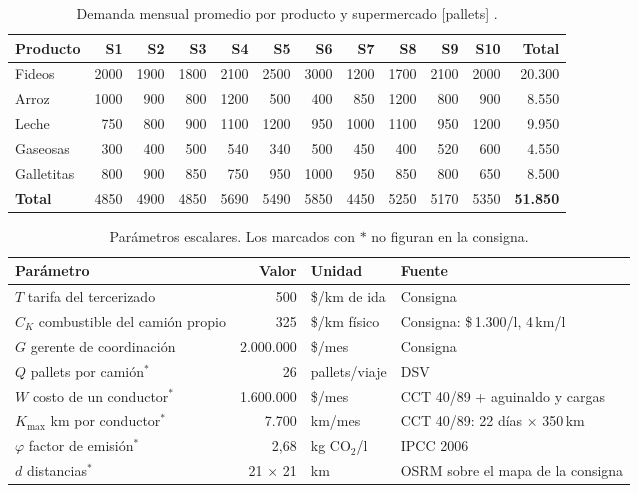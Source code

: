 \documentclass[10pt,a4paper]{article}
\begin{document}
\begin{table}[H]
\centering\small
\caption{Demanda mensual promedio por producto y supermercado [pallets] \cite{consigna}.}
\label{tab:demanda}
\setlength{\tabcolsep}{4.5pt}
\begin{tabular}{lrrrrrrrrrrr}
\toprule
\textbf{Producto} & \textbf{S1} & \textbf{S2} & \textbf{S3} & \textbf{S4} & \textbf{S5} & \textbf{S6} & \textbf{S7} & \textbf{S8} & \textbf{S9} & \textbf{S10} & \textbf{Total} \\
\midrule
Fideos     & 2000 & 1900 & 1800 & 2100 & 2500 & 3000 & 1200 & 1700 & 2100 & 2000 & 20.300 \\
Arroz      & 1000 &  900 &  800 & 1200 &  500 &  400 &  850 & 1200 &  800 &  900 &  8.550 \\
Leche      &  750 &  800 &  900 & 1100 & 1200 &  950 & 1000 & 1100 &  950 & 1200 &  9.950 \\
Gaseosas   &  300 &  400 &  500 &  540 &  340 &  500 &  450 &  400 &  520 &  600 &  4.550 \\
Galletitas &  800 &  900 &  850 &  750 &  950 & 1000 &  950 &  850 &  800 &  650 &  8.500 \\
\midrule
\textbf{Total} & 4850 & 4900 & 4850 & 5690 & 5490 & 5850 & 4450 & 5250 & 5170 & 5350 & \textbf{51.850} \\
\bottomrule
\end{tabular}
\end{table}

\begin{table}[H]
\centering\small
\caption{Parámetros escalares. Los marcados con $\ast$ no figuran en la consigna.}
\label{tab:escalares}
\begin{tabularx}{\linewidth}{@{}lrlX@{}}
\toprule
\textbf{Parámetro} & \textbf{Valor} & \textbf{Unidad} & \textbf{Fuente} \\
\midrule
$T$ tarifa del tercerizado          & 500       & \$/km de ida        & Consigna \\
$C_K$ combustible del camión propio & 325       & \$/km físico        & Consigna: \$\,1.300/l, 4\,km/l \\
$G$ gerente de coordinación          & 2.000.000 & \$/mes              & Consigna \\
$Q$ pallets por camión$^\ast$        & 26        & pallets/viaje       & DSV \cite{dsv} \\
$W$ costo de un conductor$^\ast$     & 1.600.000 & \$/mes              & CCT 40/89 \cite{cct} + aguinaldo y cargas \\
$K_{\max}$ km por conductor$^\ast$   & 7.700     & km/mes              & CCT 40/89: 22 días × 350\,km \\
$\varphi$ factor de emisión$^\ast$   & 2,68      & kg CO$_2$/l         & IPCC 2006 \cite{ipcc} \\
$d$ distancias$^\ast$                & 21 × 21   & km                  & OSRM \cite{osrm} sobre el mapa de la consigna \\
\bottomrule
\end{tabularx}
\end{table}
\end{document}
